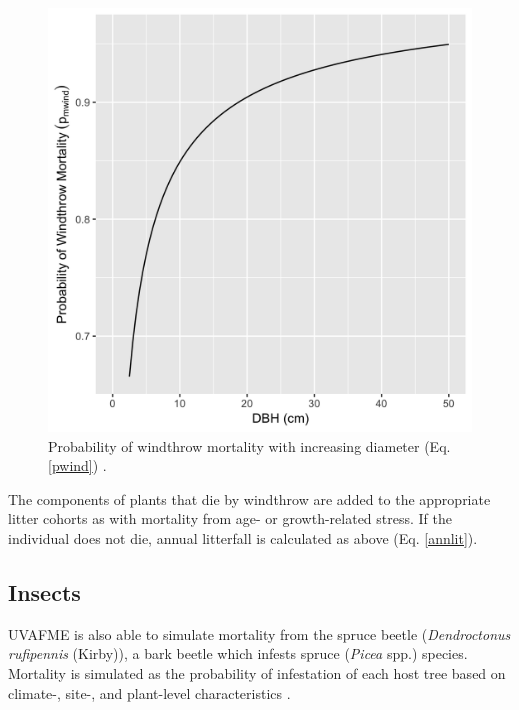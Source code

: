 \documentclass[a4paper, 12pt] {report}
\begin{document}
\begin{figure}
  \includegraphics[width=0.65\linewidth]{Figures/pwind.png}
  \caption{Probability of windthrow mortality with increasing diameter (Eq. \ref{pwind}) \protect\cite{richWindthrowMortalitySouthern2007}.}
  \label{fig:fpwind}
\end{figure}

The components of plants that die by windthrow are added to the appropriate litter cohorts as with mortality from age- or growth-related stress. If the individual does not die, annual litterfall is calculated as above (Eq. \ref{annlit}).

\subsection{Insects}
UVAFME is also able to simulate mortality from the spruce beetle (\textit{Dendroctonus rufipennis} (Kirby)), a bark beetle which infests spruce (\textit{Picea} spp.) species. Mortality is simulated as the probability of infestation of each host tree based on climate-, site-, and plant-level characteristics \cite{fosterModelingInteractiveEffects2018}. 
\end{document}

